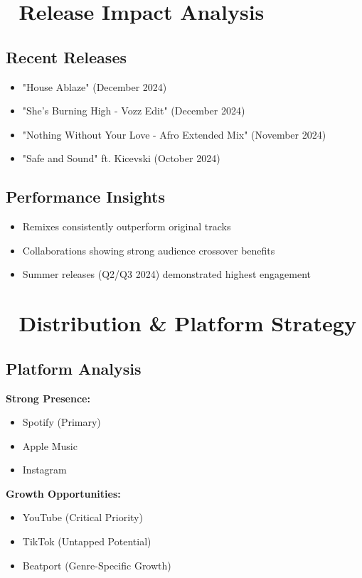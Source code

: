 \documentclass{article}
\begin{document}
\section*{🎵 Release Impact Analysis}

\subsection*{Recent Releases}
\begin{itemize}
\item "House Ablaze" (December 2024)
\item "She's Burning High - Vozz Edit" (December 2024)
\item "Nothing Without Your Love - Afro Extended Mix" (November 2024)
\item "Safe and Sound" ft. Kicevski (October 2024)
\end{itemize}

\subsection*{Performance Insights}
\begin{itemize}
\item Remixes consistently outperform original tracks
\item Collaborations showing strong audience crossover benefits
\item Summer releases (Q2/Q3 2024) demonstrated highest engagement
\end{itemize}

\section*{📱 Distribution \& Platform Strategy}

\subsection*{Platform Analysis}
\textbf{Strong Presence:}
\begin{itemize}
\item Spotify (Primary)
\item Apple Music
\item Instagram
\end{itemize}

\textbf{Growth Opportunities:}
\begin{itemize}
\item YouTube (Critical Priority)
\item TikTok (Untapped Potential)
\item Beatport (Genre-Specific Growth)
\end{itemize}
\end{document}
